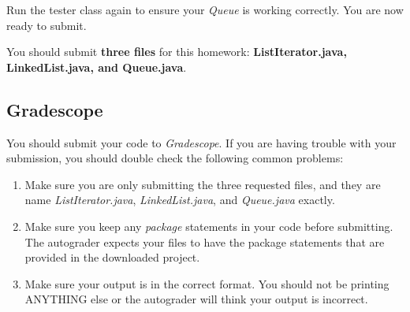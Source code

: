 \documentclass[paper=a4, fontsize=11pt, parskip=full]{scrartcl} %
\numberwithin{equation}{section} %
\numberwithin{figure}{section} %
\numberwithin{table}{section} %
\begin{document}
Run the tester class again to ensure your \emph{Queue} is working correctly. You are now ready to submit.

You should submit \textbf{three files} for this homework: \textbf{ListIterator.java, LinkedList.java, and Queue.java}.

\subsection{Gradescope}

You should submit your code to \emph{Gradescope}. If you are having trouble with your submission, you should double check the following common problems:

\begin{enumerate}
	\item Make sure you are only submitting the three requested files, and they are name \emph{ListIterator.java}, \emph{LinkedList.java}, and \emph{Queue.java} exactly.
	\item Make sure you keep any \emph{package} statements in your code before submitting. The autograder expects your files to have the package statements that are provided in the downloaded project.
	\item Make sure your output is in the correct format. You should not be printing ANYTHING else or the autograder will think your output is incorrect.
\end{enumerate}


\end{document}
